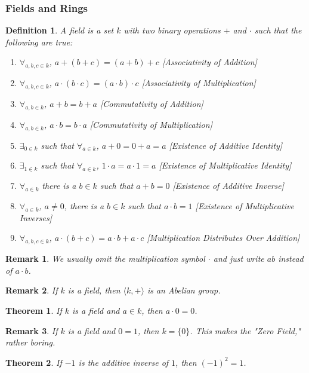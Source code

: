 \documentclass[oneside]{book}
\theoremstyle{mystyle}
\newtheorem{theorem}{Theorem}[section]
\newtheorem{definition}{Definition}[section]
\newtheorem{remark}{Remark}[section]
\begin{document}
\subsubsection{Fields and Rings}
\begin{definition}
A field is a set $k$ with two binary operations $+$ and $\cdot$ such that the following are true:
\begin{enumerate}
    \item $\forall_{a,b,c\in k}$, $a+(b+c)=(a+b)+c$ \hfill [Associativity of Addition]
    \item $\forall_{a,b,c\in k}$, $a\cdot(b\cdot c) = (a\cdot b)\cdot c$ \hfill [Associativity of Multiplication]
    \item $\forall_{a,b\in k}$, $a+b=b+a$ \hfill [Commutativity of Addition]
    \item $\forall_{a,b\in k}$, $a\cdot b = b\cdot a$ \hfill [Commutativity of Multiplication]
    \item $\exists_{0 \in k}$ such that $\forall_{a\in k}$, $a+0=0+a = a$ \hfill [Existence of Additive Identity]
    \item $\exists_{1\in k}$ such that $\forall_{a\in k}$, $1\cdot a=a\cdot 1 = a$ \hfill [Existence of Multiplicative Identity]
    \item $\forall_{a\in k}$ there is a $b\in k$ such that $a+b=0$ \hfill [Existence of Additive Inverse]
    \item $\forall_{a\in k}$, $a\ne 0$, there is a $b\in k$ such that $a\cdot b = 1$ \hfill [Existence of Multiplicative Inverses]
    \item $\forall_{a,b,c\in k}$, $a\cdot(b+c) = a\cdot b + a\cdot c$ \hfill [Multiplication Distributes Over Addition]
\end{enumerate}
\end{definition}
\begin{remark}
We usually omit the multiplication symbol $\cdot$ and just write $ab$ instead of $a\cdot b$.
\end{remark}
\begin{remark}
If $k$ is a field, then $\langle k, + \rangle$ is an Abelian group.
\end{remark}
\begin{theorem}
If $k$ is a field and $a\in k$, then $a\cdot 0 = 0$.
\end{theorem}
\begin{remark}
If $k$ is a field and $0=1$, then $k=\{0\}$. This makes the "Zero Field," rather boring.
\end{remark}
\begin{theorem}
If $-1$ is the additive inverse of $1$, then $(-1)^2 = 1$.
\end{theorem}
\end{document}
